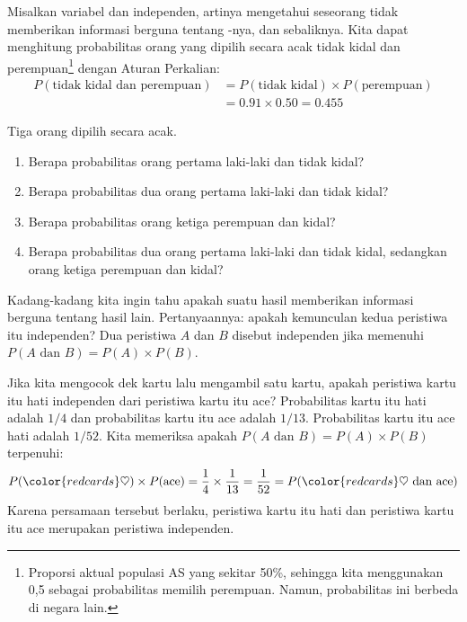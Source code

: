 Misalkan variabel  dan
 independen,
artinya mengetahui  seseorang tidak memberikan informasi
berguna tentang -nya, dan sebaliknya.
Kita dapat menghitung probabilitas orang yang dipilih secara acak
tidak kidal dan perempuan\footnote{Proporsi aktual
  populasi AS yang  sekitar 50\%,
  sehingga kita menggunakan 0,5 sebagai probabilitas memilih perempuan.
  Namun, probabilitas ini berbeda di negara lain.}
dengan Aturan Perkalian:
\begin{align*}
P(\text{tidak kidal dan perempuan})
    &= P(\text{tidak kidal}) \times  P(\text{perempuan}) \\
    &= 0.91 \times  0.50 = 0.455
\end{align*}


\begin{exercisewrap}
\begin{nexercise}
Tiga orang dipilih secara acak.\footnotemark \vspace{-1.5mm}
\begin{enumerate}
\setlength{\itemsep}{0mm}
\item[(a)] Berapa probabilitas orang pertama laki-laki dan tidak kidal?
\item[(b)] Berapa probabilitas dua orang pertama laki-laki dan tidak kidal?
\item[(c)] Berapa probabilitas orang ketiga perempuan dan kidal?
\item[(d)] Berapa probabilitas dua orang pertama laki-laki dan tidak kidal, sedangkan orang ketiga perempuan dan kidal?
\end{enumerate}
\end{nexercise}
\end{exercisewrap}

Kadang-kadang kita ingin tahu apakah suatu hasil memberikan informasi berguna tentang hasil lain. Pertanyaannya: apakah kemunculan kedua peristiwa itu independen? Dua peristiwa $A$ dan $B$ disebut independen jika memenuhi
$P(A \text{ dan }B) = P(A) \times  P(B)$.

\begin{examplewrap}
\begin{nexample}{Jika kita mengocok dek kartu lalu mengambil satu kartu, apakah peristiwa kartu itu hati independen dari peristiwa kartu itu ace?}
Probabilitas kartu itu hati adalah $1/4$ dan probabilitas kartu itu ace adalah $1/13$. Probabilitas kartu itu ace hati adalah $1/52$.
Kita memeriksa apakah $P(A \text{ dan }B) = P(A) \times  P(B)$
terpenuhi:
\begin{align*}
P({\color{redcards}\heartsuit})\times P(\text{ace}) = \frac{1}{4}\times \frac{1}{13} = \frac{1}{52} 
					= P({\color{redcards}\heartsuit}\text{ dan ace})
\end{align*}
Karena persamaan tersebut berlaku, peristiwa kartu itu hati dan peristiwa kartu itu ace merupakan peristiwa independen.
\end{nexample}
\end{examplewrap}

